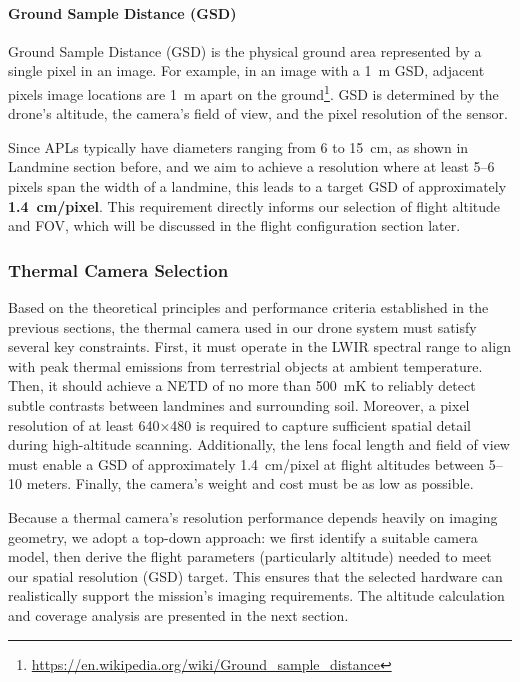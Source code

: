 \paragraph{Ground Sample Distance (GSD)}

Ground Sample Distance (GSD) is the physical ground area represented by a single pixel in an image. For example, in an image with a 1~m GSD, adjacent pixels image locations are 1~m apart on the ground\footnote{\url{https://en.wikipedia.org/wiki/Ground_sample_distance}}. GSD is determined by the drone’s altitude, the camera’s field of view, and the pixel resolution of the sensor.

Since APLs typically have diameters ranging from 6 to 15~cm, as shown in Landmine section before, and we aim to achieve a resolution where at least 5–6 pixels span the width of a landmine, this leads to a target GSD of approximately \textbf{1.4~cm/pixel}. This requirement directly informs our selection of flight altitude and FOV, which will be discussed in the flight configuration section later.


\subsubsection{Thermal Camera Selection}

Based on the theoretical principles and performance criteria established in the previous sections, the thermal camera used in our drone system must satisfy several key constraints. First, it must operate in the LWIR spectral range to align with peak thermal emissions from terrestrial objects at ambient temperature. Then, it should achieve a NETD of no more than 500~mK to reliably detect subtle contrasts between landmines and surrounding soil. Moreover, a pixel resolution of at least 640×480 is required to capture sufficient spatial detail during high-altitude scanning. Additionally, the lens focal length and field of view must enable a GSD of approximately 1.4~cm/pixel at flight altitudes between 5–10 meters. Finally, the camera’s weight and cost must be as low as possible.

Because a thermal camera’s resolution performance depends heavily on imaging geometry, we adopt a top-down approach: we first identify a suitable camera model, then derive the flight parameters (particularly altitude) needed to meet our spatial resolution (GSD) target. This ensures that the selected hardware can realistically support the mission’s imaging requirements. The altitude calculation and coverage analysis are presented in the next section.

